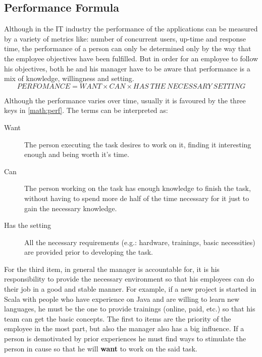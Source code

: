 \subsection{Performance Formula}
\label{subsec:formula}
Although in the IT industry the performance of the applications can be measured by a variety of metrics like: number of concurrent users, up-time and response time, the performance of a person can only be determined only by the way that the employee objectives have been fulfilled. 
But in order for an employee to follow his objectives, both he and his manager have to be aware that performance is a mix of knowledge, willingness and setting.
\begin{equation}
\label{math:perf}
PERFOMANCE = WANT \times CAN \times HAS\ THE\ NECESSARY\ SETTING
\end{equation}

Although the performance varies over time, usually it is favoured by the three keys in \cref{math:perf}. The terms can be interpreted as:
\begin{description}
\item[Want] The person executing the task desires to work on it, finding it interesting enough and being worth it's time.
\item[Can] The person working on the task has enough knowledge to finish the task, without having to spend more de half of the time necessary for it just to gain the necessary knowledge. 
\item[Has the setting] All the necessary requirements (e.g.: hardware, trainings, basic necessities) are provided prior to developing the task.
\end{description}

For the third item, in general the manager is accountable for, it is his responsibility to provide the necessary environment so that his employees can do their job in a good and stable manner. For example, if a new project is started in Scala with people who have experience on Java and are willing to learn new languages, he must be the one to provide trainings (online, paid, etc.) so that his team can get the basic concepts. The first to items are the priority of the employee in the most part, but also the manager also has a big influence. If a person is demotivated by prior experiences he must find ways to stimulate the person in cause so that he will \textbf{want} to work on the said task.

